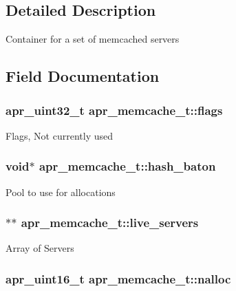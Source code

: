 \subsection{Detailed Description}
Container for a set of memcached servers 

\subsection{Field Documentation}
\hypertarget{structapr__memcache__t_aeb0639bc75fd5bc7561ab88f671f75d3}{
\subsubsection[{flags}]{\setlength{\rightskip}{0pt plus 5cm}apr\-\_\-uint32\-\_\-t apr\-\_\-memcache\-\_\-t\-::flags}}\label{structapr__memcache__t_aeb0639bc75fd5bc7561ab88f671f75d3}
Flags, Not currently used \hypertarget{structapr__memcache__t_a26614ee9cfdc014d7e5ea46df253193a}{
\subsubsection[{hash\-\_\-baton}]{\setlength{\rightskip}{0pt plus 5cm}void$\ast$ apr\-\_\-memcache\-\_\-t\-::hash\-\_\-baton}}\label{structapr__memcache__t_a26614ee9cfdc014d7e5ea46df253193a}
Pool to use for allocations \hypertarget{structapr__memcache__t_a85f916183d0aae6aaa88251edc7a1f81}{
\subsubsection[{live\-\_\-servers}]{$\ast$$\ast$ apr\-\_\-memcache\-\_\-t\-::live\-\_\-servers}}\label{structapr__memcache__t_a85f916183d0aae6aaa88251edc7a1f81}
Array of Servers \hypertarget{structapr__memcache__t_a95d15cfa5b291700cd9a697687eeac73}{
\subsubsection[{nalloc}]{\setlength{\rightskip}{0pt plus 5cm}apr\-\_\-uint16\-\_\-t apr\-\_\-memcache\-\_\-t\-::nalloc}}\label{structapr__memcache__t_a95d15cfa5b291700cd9a697687eeac73}
